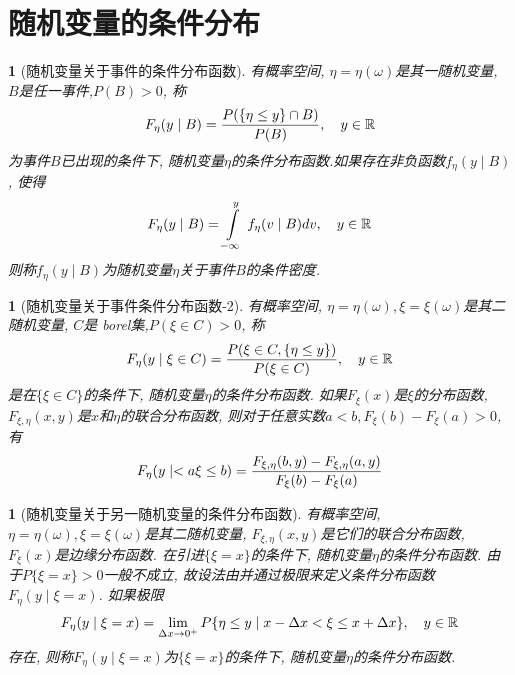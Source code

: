 \section{随机变量的条件分布}

\newtheorem{conditional_distribution_function_var_event}[theorem_root]{}
\begin{conditional_distribution_function_var_event}[随机变量关于事件的条件分布函数]
有概率空间\prbsp, \(\eta = \eta(\omega)\)是其一随机变量, \(B\)是任一事件,\(P(B) > 0\), 称
\begin{align}
    F_{\eta}(y\mid B) = {P(\{\eta\le y\}\cap B)\over P(B)},\quad y\in\Rs
\end{align}
为事件\(B\)已出现的条件下, 随机变量\(\eta\)的条件分布函数.如果存在非负函数\(f_{\eta}(y\mid B)\), 使得
\begin{align}
    F_{\eta}(y\mid B) = \int\limits_{-\infty}^{y}\,f_{\eta}(v\mid B)dv,\quad y\in\Rs
\end{align}
则称\(f_{\eta}(y\mid B)\)为随机变量\(\eta\)关于事件\(B\)的条件密度.
\end{conditional_distribution_function_var_event}

\newtheorem{conditional_distribution_function_var_var}[theorem_root]{}
\begin{conditional_distribution_function_var_var}[随机变量关于事件条件分布函数-2]
有概率空间\prbsp, \(\eta = \eta(\omega), \xi = \xi(\omega)\)是其二随机变量, \(C\)是 borel集,\(P(\xi\in C) > 0\), 称
\begin{align}
    F_{\eta}(y\mid \xi\in C) = {P(\xi\in C, \{\eta\le y\})\over P(\xi\in C)},\quad y\in\Rs
\end{align}
是在\(\{\xi\in C\}\)的条件下, 随机变量\(\eta\)的条件分布函数. 如果\(F_{\xi}(x)\)是\(\xi\)的分布函数, 
\(F_{\xi,\eta}(x, y)\)是\(x\)和\(\eta\)的联合分布函数, 则对于任意实数\(a<b, F_{\xi}(b) - F_{\xi}(a) > 0\), 有
\begin{align}
    \label{equ:rva}
    F_{\eta}(y\mid <a\xi\le b) = {F_{\xi, \eta}(b, y) - F_{\xi, \eta}(a, y)\over F_{\xi}(b) - F_{\xi}(a)}
\end{align}
\end{conditional_distribution_function_var_var}

\newtheorem{conditional_distribution_function_var_var__}[theorem_root]{}
\begin{conditional_distribution_function_var_var__}[随机变量关于另一随机变量的条件分布函数]
有概率空间\prbsp, \(\eta = \eta(\omega), \xi = \xi(\omega)\)是其二随机变量, 
\(F_{\xi,\eta}(x, y)\)是它们的联合分布函数, \(F_{\xi}(x)\)是边缘分布函数.
在引进\(\{\xi = x\}\)的条件下, 随机变量\(\eta\)的条件分布函数. 由于\(P\{\xi = x\}>0\)一般不成立,
故设法由并通过极限来定义条件分布函数\(F_{\eta}(y\mid \xi = x)\). 
如果极限
\begin{align}
    F_{\eta}(y\mid\xi = x) = \lim\limits_{\Delta x\to 0^+}P\{\eta\le y\mid x-\Delta x<\xi\le x+\Delta x\},\quad y\in\Rs
\end{align}
存在, 则称\(F_{\eta}(y\mid \xi = x)\)为\(\{\xi = x\}\)的条件下, 随机变量\(\eta\)的条件分布函数.
\end{conditional_distribution_function_var_var__}

